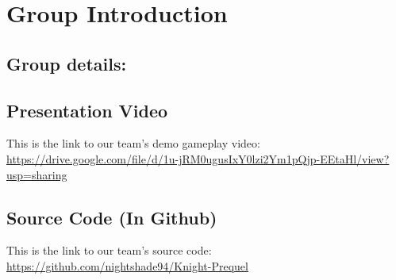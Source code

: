 \section*{Group Introduction}

\subsection*{Group details:}
\begin{center}
	\begin{table}[H]
		\renewcommand{\arraystretch}{1.5}
		\setlength{\tabcolsep}{8pt} %
		\caption{Group details}
	\end{table}
\end{center}

\subsection*{Presentation Video}
This is the link to our team's demo gameplay video: \newline
\href{https://drive.google.com/file/d/1u-jRM0ugusIxY0lzi2Ym1pQjp-EEtaHl/view?usp=sharing}{https://drive.google.com/file/d/1u-jRM0ugusIxY0lzi2Ym1pQjp-EEtaHl/view?usp=sharing}

\subsection*{Source Code (In Github)}
This is the link to our team's source code:
\href{https://github.com/nightshade94/Knight-Prequel}{https://github.com/nightshade94/Knight-Prequel}


